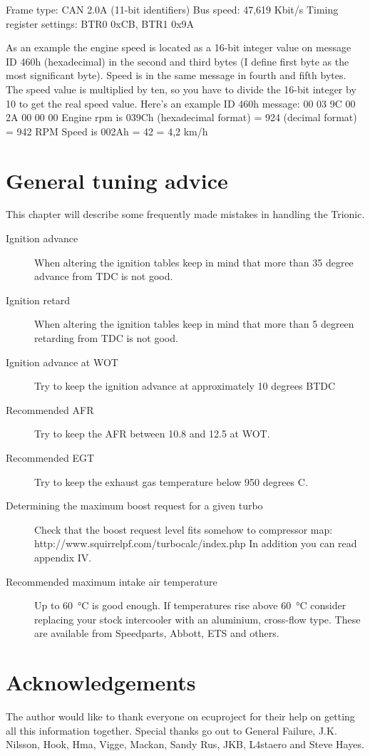 \documentclass[11pt,a4paper]{book}
\begin{document}
Frame type: CAN 2.0A (11-bit identifiers)
Bus speed: 47,619 Kbit/s
Timing register settings: BTR0 0xCB, BTR1 0x9A

As an example the engine speed is located as a 16-bit integer value on message ID 460h
(hexadecimal) in the second and third bytes (I define first byte as the most significant byte). Speed is
in the same message in fourth and fifth bytes. The speed value is multiplied by ten, so you have to
divide the 16-bit integer by 10 to get the real speed value.
Here's an example ID 460h message: 00 03 9C 00 2A 00 00 00
Engine rpm is 039Ch (hexadecimal format) = 924 (decimal format) = 942 RPM
Speed is 002Ah = 42 = 4,2 km/h

\chapter{General tuning advice}
This chapter will describe some frequently made mistakes in handling the Trionic.
\begin{description}
    \item[Ignition advance]
        When altering the ignition tables keep in mind that more than 35 degree advance from TDC is not good.
    \item[Ignition retard]
        When altering the ignition tables keep in mind that more than 5 degreen retarding from TDC is not good.
    \item[Ignition advance at WOT] Try to keep the ignition advance at
        approximately 10 degrees BTDC
    \item[Recommended AFR] Try to keep the AFR between 10.8 and 12.5 at WOT.
    \item[Recommended EGT] Try to keep the exhaust gas temperature below 950
        degrees C.
    \item[Determining the maximum boost request for a given turbo] Check that the boost request level fits somehow to compressor map:
        http://www.squirrelpf.com/turbocalc/index.php
        In addition you can read appendix IV.
    \item[Recommended maximum intake air temperature] Up to
        \SI{60}{\celsius} is good enough. If temperatures rise above
        \SI{60}{\celsius} consider replacing your stock
        intercooler with an aluminium, cross-flow type. These are available from Speedparts, Abbott, ETS and
        others.
\end{description}

\chapter{Acknowledgements}
The author would like to thank everyone on ecuproject for their help on getting
all this information together. Special thanks go out to General Failure, J.K.
Nilsson, Hook, Hma, Vigge, Mackan, Sandy Rus, JKB, L4staero and Steve Hayes.
\end{document}
